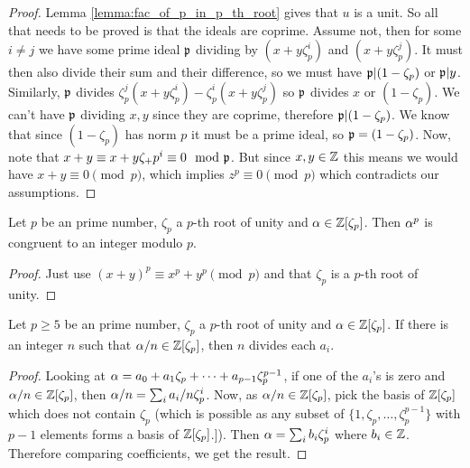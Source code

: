 \begin{proof}
	 Lemma \ref{lemma:fac_of_p_in_p_th_root} gives that $u$ is a unit. So all that needs to be proved is that the ideals are coprime. Assume not, then for some $i \neq j$ we have some prime ideal $\mathfrak{p}$ dividing by $(x+y\zeta_p^i)$ and $(x+y\zeta_p^j)$. It must then also divide their sum and their difference, so we must have $\mathfrak{p} | (1-\zeta_p)$ or $\mathfrak{p} | y$. Similarly, $\mathfrak{p}$ divides $\zeta_p^j(x+y\zeta_p^i)-\zeta_p^i(x+y\zeta_p^j)$ so $\mathfrak{p}$ divides $x$ or $(1-\zeta_p)$. We can't have $\mathfrak{p}$ dividing $x,y$ since they are coprime, therefore $\mathfrak{p} |(1-\zeta_p)$. We know that since $(1-\zeta_p)$ has norm $p$ it must be a prime ideal, so $\mathfrak{p}=(1-\zeta_p)$. Now, note that $x+y \equiv x+y\zeta_+p^i \equiv 0 \mod {\mathfrak{p}}$. But since $x,y \in \mathbb{Z}$ this means we would have $x+y \equiv 0 \pmod p$, which implies $z^p \equiv 0 \pmod p$ which contradicts our assumptions.
\end{proof}

\begin{lemma}\label{lem:flt_fact_3}

	 	Let $p$ be an prime number, $\zeta_p$ a $p$-th root of unity and $\alpha \in \mathbb{Z}[\zeta_p]$. Then $\alpha^p$ is congruent to an integer modulo $p$.
\end{lemma}

\begin{proof}
	  Just use $(x+y)^p \equiv x^p + y^p \pmod p$ and that $\zeta_p$ is a $p$-th root of unity.
\end{proof}

\begin{lemma}\label{lem:flt_fact_4}
	Let $p \geq 5$ be an prime number, $\zeta_p$ a $p$-th root of unity and $ \alpha \in \mathbb{Z}[\zeta_p]$. If there is an integer $n$ such that $\alpha/n \in \mathbb{Z}[\zeta_p]$, then $n$ divides each $a_i$.
\end{lemma}

\begin{proof}
	 Looking at $\alpha=a_0+a_1\zeta_p+\cdots+a_{p-1}\zeta_p^{p-1}$, if one of the $a_i$'s is zero and $\alpha/n \in \mathbb{Z}[\zeta_p]$, then $\alpha/n=\sum_i a_i/n \zeta_p^i$. Now, as $\alpha/n \in \mathbb{Z}[\zeta_p]$, pick the basis of $\mathbb{Z}[\zeta_p]$ which does not contain $\zeta_p$ (which is possible as any subset of $\{1,\zeta_p,\dots,\zeta_p^{p-1}\}$ with $p-1$ elements forms a basis of $\mathbb{Z}[\zeta_p]$.]). Then $\alpha=\sum_i b_i \zeta_p^i$ where $b_i \in \mathbb{Z}$. Therefore comparing coefficients, we get the result.
\end{proof}

